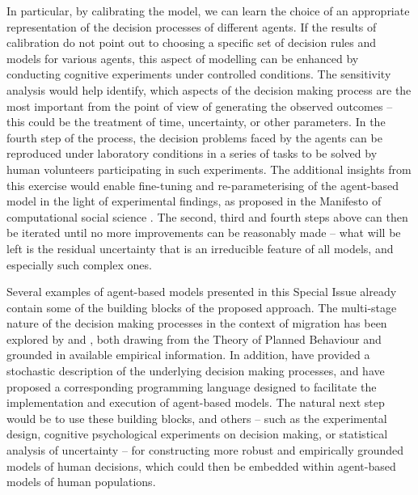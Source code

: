 \documentclass{article}
\begin{document}
In particular, by calibrating the model, we can learn the choice of an appropriate representation of the decision processes of different agents. If the results of calibration do not point out to choosing a specific set of decision rules and models for various agents, this aspect of modelling can be enhanced by conducting cognitive experiments under controlled conditions. The sensitivity analysis would help identify, which aspects of the decision making process are the most important from the point of view of generating the observed outcomes -- this could be the treatment of time, uncertainty, or other parameters. In the fourth step of the process, the decision problems faced by the agents can be reproduced under laboratory conditions in a series of tasks to be solved by human volunteers participating in such experiments. The additional insights from this exercise would enable fine-tuning and re-parameterising of the agent-based model in the light of experimental findings, as proposed in the Manifesto of computational social science \citep{Conte}. The second, third and fourth steps above can then be iterated until no more improvements can be reasonably made -- what will be left is the residual uncertainty that is an irreducible feature of all models, and especially such complex ones.

Several examples of agent-based models presented in this Special Issue already contain some of the building blocks of the proposed approach. The multi-stage nature of the decision making processes in the context of migration has been explored by \citet{Willekens2017} and \citet{Kley2017}, both drawing from the Theory of Planned Behaviour \citep{Ajzen1991} and grounded in available empirical information. In addition, \citet{Warnke2017} have provided a stochastic description of the underlying decision making processes, and have proposed a corresponding programming language designed to facilitate the implementation and execution of agent-based models. The natural next step would be to use these building blocks, and others -- such as the experimental design, cognitive psychological experiments on decision making, or statistical analysis of uncertainty -- for constructing more robust and empirically grounded models of human decisions, which could then be embedded within agent-based models of human populations. 
\end{document}
